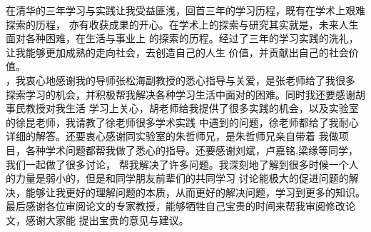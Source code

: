 \begin{acknowledgement}
 在清华的三年学习与实践让我受益匪浅，回首三年的学习历程，既有在学术上艰难探索的历程，
 亦有收获成果的开心。在学术上的探索与研究其实就是，未来人生面对各种困难，在生活与事业上
 的探索的历程。经过了三年的学习实践的洗礼，让我能够更加成熟的走向社会，去创造自己的人生
 价值，并贡献出自己的社会价值。\\
 ，我衷心地感谢我的导师张松海副教授的悉心指导与关爱，是张老师给了我很多
 探索学习的机会，并积极帮我解决各种学习生活中面对的困难。同时我还要感谢胡事民教授对我生活
 学习上关心，胡老师给我提供了很多实践的机会，以及实验室的徐昆老师，我请教了徐老师很多学术实践
 中遇到的问题，徐老师都给了我耐心详细的解答。还要衷心感谢同实验室的朱哲师兄，是朱哲师兄亲自带着
 我做项目，各种学术问题都帮我做了悉心的指导。还要感谢刘斌，卢嘉铭,梁缘等同学，我们一起做了很多讨论，
 帮我解决了许多问题。我深刻地了解到很多时候一个人的力量是弱小的，但是和同学朋友前辈们的共同学习
 讨论能极大的促进问题的解决，能够让我更好的理解问题的本质，从而更好的解决问题，学习到更多的知识。\\
 \indent 最后感谢各位审阅论文的专家教授，能够牺牲自己宝贵的时间来帮我审阅修改论文，感谢大家能
 提出宝贵的意见与建议。

\end{acknowledgement}
